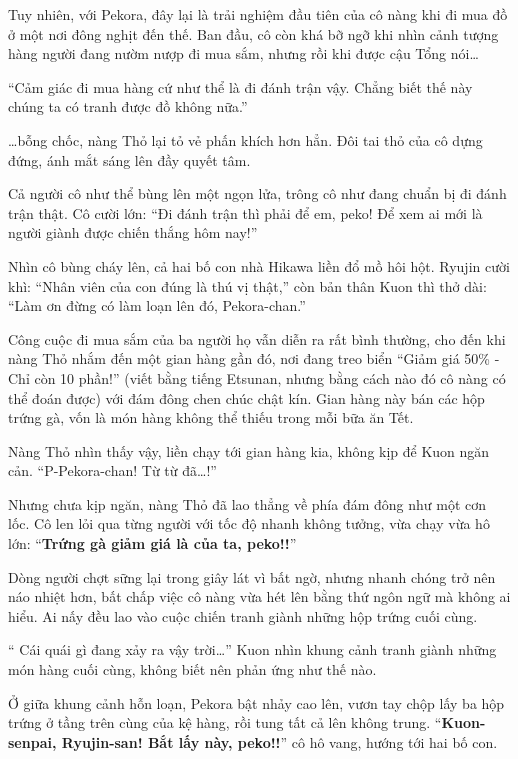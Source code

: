 \documentclass[../main.tex]{subfiles}
\begin{document}
Tuy nhiên, với Pekora, đây lại là trải nghiệm đầu tiên của cô nàng khi đi mua đồ ở một nơi đông nghịt đến thế. Ban đầu, cô còn khá bỡ ngỡ khi nhìn cảnh tượng hàng người đang nườm nượp đi mua sắm, nhưng rồi khi được cậu Tổng nói\dots

``Cảm giác đi mua hàng cứ như thể là đi đánh trận vậy. Chẳng biết thế này chúng ta có tranh được đồ không nữa.''

\dots bỗng chốc, nàng Thỏ lại tỏ vẻ phấn khích hơn hẳn. Đôi tai thỏ của cô dựng đứng, ánh mắt sáng lên đầy quyết tâm.

Cả người cô như thể bùng lên một ngọn lửa, trông cô như đang chuẩn bị đi đánh trận thật. Cô cười lớn: ``Đi đánh trận thì phải để em, peko! Để xem ai mới là người giành được chiến thắng hôm nay!''

Nhìn cô bùng cháy lên, cả hai bố con nhà Hikawa liền đổ mồ hôi hột. Ryujin cười khì: ``Nhân viên của con đúng là thú vị thật,'' còn bản thân Kuon thì thở dài: ``Làm ơn đừng có làm loạn lên đó, Pekora-chan.''

\il

Công cuộc đi mua sắm của ba người họ vẫn diễn ra rất bình thường, cho đến khi nàng Thỏ nhắm đến một gian hàng gần đó, nơi đang treo biển ``Giảm giá 50\% - Chỉ còn 10 phần!'' (viết bằng tiếng Etsunan, nhưng bằng cách nào đó cô nàng có thể đoán được) với đám đông chen chúc chật kín. Gian hàng này bán các hộp trứng gà, vốn là món hàng không thể thiếu trong mỗi bữa ăn Tết.

Nàng Thỏ nhìn thấy vậy, liền chạy tới gian hàng kia, không kịp để Kuon ngăn cản. ``P-Pekora-chan! Từ từ đã\dots!''

Nhưng chưa kịp ngăn, nàng Thỏ đã lao thẳng về phía đám đông như một cơn lốc. Cô len lỏi qua từng người với tốc độ nhanh không tưởng, vừa chạy vừa hô lớn: ``\textbf{Trứng gà giảm giá là của ta, peko!!}''

Dòng người chợt sững lại trong giây lát vì bất ngờ, nhưng nhanh chóng trở nên náo nhiệt hơn, bất chấp việc cô nàng vừa hét lên bằng thứ ngôn ngữ mà không ai hiểu. Ai nấy đều lao vào cuộc chiến tranh giành những hộp trứng cuối cùng.

``{\color{red} Cái quái gì đang xảy ra vậy trời\dots}'' Kuon nhìn khung cảnh tranh giành những món hàng cuối cùng, không biết nên phản ứng như thế nào.

Ở giữa khung cảnh hỗn loạn, Pekora bật nhảy cao lên, vươn tay chộp lấy ba hộp trứng ở tầng trên cùng của kệ hàng, rồi tung tất cả lên không trung. ``\textbf{Kuon-senpai, Ryujin-san! Bắt lấy này, peko!!}'' cô hô vang, hướng tới hai bố con.
\end{document}
